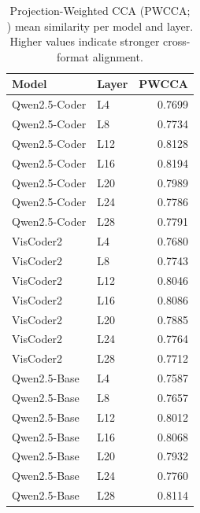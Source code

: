 \begin{table}[t]
\centering
\caption{Projection-Weighted CCA (PWCCA; \citealt{morcos2018pwcca}) mean similarity per model and layer.  Higher values indicate stronger cross-format alignment.}
\label{tab:pwcca_complete}
\small
\begin{tabular}{ll r}
\toprule
\textbf{Model} & \textbf{Layer} & \textbf{PWCCA} \\
\midrule
Qwen2.5-Coder & L4  & 0.7699 \\
Qwen2.5-Coder & L8  & 0.7734 \\
Qwen2.5-Coder & L12 & 0.8128 \\
Qwen2.5-Coder & L16 & 0.8194 \\
Qwen2.5-Coder & L20 & 0.7989 \\
Qwen2.5-Coder & L24 & 0.7786 \\
Qwen2.5-Coder & L28 & 0.7791 \\
\midrule
VisCoder2      & L4  & 0.7680 \\
VisCoder2      & L8  & 0.7743 \\
VisCoder2      & L12 & 0.8046 \\
VisCoder2      & L16 & 0.8086 \\
VisCoder2      & L20 & 0.7885 \\
VisCoder2      & L24 & 0.7764 \\
VisCoder2      & L28 & 0.7712 \\
\midrule
Qwen2.5-Base   & L4  & 0.7587 \\
Qwen2.5-Base   & L8  & 0.7657 \\
Qwen2.5-Base   & L12 & 0.8012 \\
Qwen2.5-Base   & L16 & 0.8068 \\
Qwen2.5-Base   & L20 & 0.7932 \\
Qwen2.5-Base   & L24 & 0.7760 \\
Qwen2.5-Base   & L28 & 0.8114 \\
\bottomrule
\end{tabular}
\end{table}

